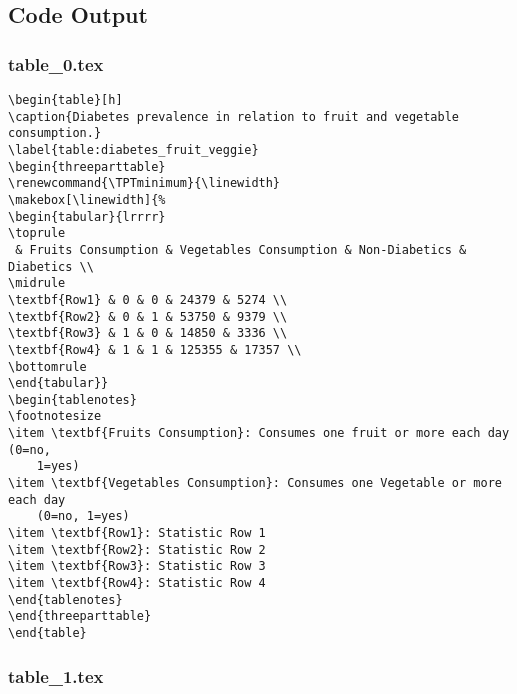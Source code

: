 \documentclass[11pt]{article}
\begin{document}
\subsection{Code Output}

\subsubsection*{table\_0.tex}

\begin{Verbatim}[tabsize=4]
\begin{table}[h]
\caption{Diabetes prevalence in relation to fruit and vegetable consumption.}
\label{table:diabetes_fruit_veggie}
\begin{threeparttable}
\renewcommand{\TPTminimum}{\linewidth}
\makebox[\linewidth]{%
\begin{tabular}{lrrrr}
\toprule
 & Fruits Consumption & Vegetables Consumption & Non-Diabetics & Diabetics \\
\midrule
\textbf{Row1} & 0 & 0 & 24379 & 5274 \\
\textbf{Row2} & 0 & 1 & 53750 & 9379 \\
\textbf{Row3} & 1 & 0 & 14850 & 3336 \\
\textbf{Row4} & 1 & 1 & 125355 & 17357 \\
\bottomrule
\end{tabular}}
\begin{tablenotes}
\footnotesize
\item \textbf{Fruits Consumption}: Consumes one fruit or more each day (0=no,
	1=yes)
\item \textbf{Vegetables Consumption}: Consumes one Vegetable or more each day
	(0=no, 1=yes)
\item \textbf{Row1}: Statistic Row 1
\item \textbf{Row2}: Statistic Row 2
\item \textbf{Row3}: Statistic Row 3
\item \textbf{Row4}: Statistic Row 4
\end{tablenotes}
\end{threeparttable}
\end{table}

\end{Verbatim}

\subsubsection*{table\_1.tex}
\end{document}
